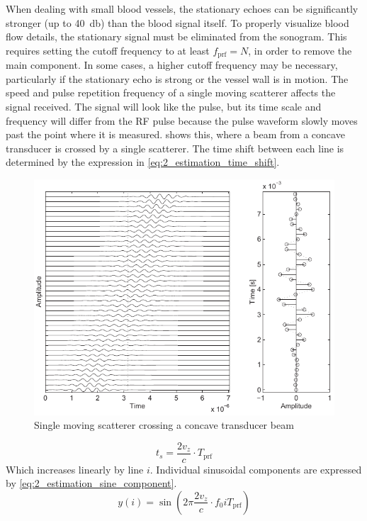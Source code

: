 When dealing with small blood vessels, the stationary echoes can be significantly stronger (up to \qty{40}{\decibel}) than the blood signal itself. To properly visualize blood flow details, the stationary signal must be eliminated from the sonogram. This requires setting the cutoff frequency to at least $f_{\mathrm{prf}} = N$, in order to remove the main component. In some cases, a higher cutoff frequency may be necessary, particularly if the stationary echo is strong or the vessel wall is in motion. The speed and pulse repetition frequency of a single moving scatterer affects the signal received. The signal will look like the pulse, but its time scale and frequency will differ from the RF pulse because the pulse waveform slowly moves past the point where it is measured.  shows this, where a beam from a concave transducer is crossed by a single scatterer. The time shift between each line is determined by the expression in \cref{eq:2_estimation_time_shift}.
\begin{figure}[htbp]
	\centering
	\includegraphics[width=.8\textwidth]{Figures/2_estimation_single_scatterer.pdf}
	\caption[Single moving scatterer crossing a concave transducer beam]{Single moving scatterer crossing a concave transducer beam \cite{JensenUltrasoundBook}}
	\label{fig:2_estimation_single_scatterer}
\end{figure}
\begin{equation} \label{eq:2_estimation_time_shift}
	t_{s} = \frac{2v_{z}}{c} \cdot T_{\mathrm{prf}}
\end{equation}
Which increases linearly by line $i$. Individual sinusoidal components are expressed by \cref{eq:2_estimation_sine_component}.
\begin{equation} \label{eq:2_estimation_sine_component}
	y(i) = \sin \left( 2\pi \frac{2v_{z}}{c}\cdot f_{0} iT_{\mathrm{prf}} \right)
\end{equation}
